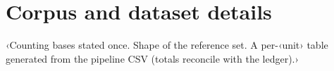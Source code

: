 \clearpage
\section{Corpus and dataset details}
\label{app:corpus}
‹Counting bases stated once. Shape of the reference set. A per-‹unit› table generated from the pipeline CSV (totals reconcile with the ledger).›

